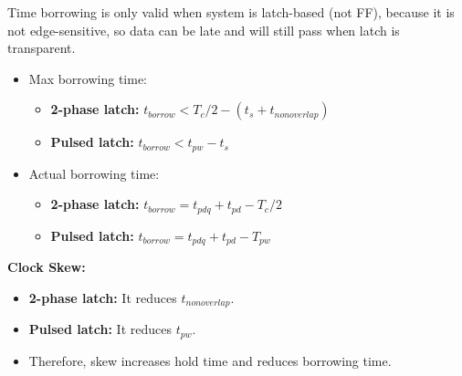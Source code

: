 \documentclass[11pt]{article}
\begin{document}
    Time borrowing is only valid when system is latch-based (not FF), because it is not edge-sensitive, so data can be late and will still pass when latch is transparent.
    \begin{itemize}
        \item Max borrowing time:
        \begin{itemize}[topsep=0pt]
            \item \textbf{2-phase latch:} $t_{borrow} < T_c / 2 - (t_s + t_{nonoverlap})$
            \item \textbf{Pulsed latch:} $t_{borrow} < t_{pw} - t_s$
        \end{itemize}
        \item Actual borrowing time:
        \vspace{5pt}
        \begin{itemize}[topsep=0pt]
            \item \textbf{2-phase latch:} $t_{borrow} = t_{pdq} + t_{pd} - T_c / 2$
            \item \textbf{Pulsed latch:} $t_{borrow} = t_{pdq} + t_{pd} - T_{pw}$
        \end{itemize}
    \end{itemize}
    \textbf{Clock Skew:} 
    \begin{itemize}
        \item \textbf{2-phase latch:} It reduces $t_{nonoverlap}$. 
        \item \textbf{Pulsed latch:} It reduces $t_{pw}$.
        \item Therefore, skew increases hold time and reduces borrowing time.
    \end{itemize}
\end{document}

